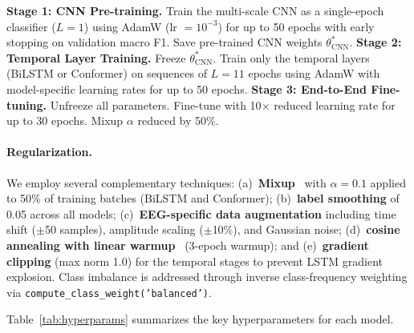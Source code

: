 \documentclass[final]{article}
\begin{document}
\begin{algorithm}[t]
\caption{Three-Stage Training Pipeline}
\label{alg:training}
\begin{algorithmic}[1]
\STATE \textbf{Stage 1: CNN Pre-training.} Train the multi-scale CNN as a single-epoch classifier ($L=1$) using AdamW (lr $= 10^{-3}$) for up to 50 epochs with early stopping on validation macro F1.
\STATE Save pre-trained CNN weights $\theta_{\text{CNN}}^{*}$.
\STATE \textbf{Stage 2: Temporal Layer Training.} Freeze $\theta_{\text{CNN}}^{*}$. Train only the temporal layers (BiLSTM or Conformer) on sequences of $L = 11$ epochs using AdamW with model-specific learning rates for up to 50 epochs.
\STATE \textbf{Stage 3: End-to-End Fine-tuning.} Unfreeze all parameters. Fine-tune with 10$\times$ reduced learning rate for up to 30 epochs. Mixup $\alpha$ reduced by 50\%.
\end{algorithmic}
\end{algorithm}

\paragraph{Regularization.} We employ several complementary techniques: (a)~\textbf{Mixup}~\cite{Zhang2018} with $\alpha = 0.1$ applied to 50\% of training batches (BiLSTM and Conformer); (b)~\textbf{label smoothing} of 0.05 across all models; (c)~\textbf{EEG-specific data augmentation} including time shift ($\pm$50 samples), amplitude scaling ($\pm$10\%), and Gaussian noise; (d)~\textbf{cosine annealing with linear warmup}~\cite{Loshchilov2017} (3-epoch warmup); and (e)~\textbf{gradient clipping} (max norm 1.0) for the temporal stages to prevent LSTM gradient explosion. Class imbalance is addressed through inverse class-frequency weighting via \texttt{compute\_class\_weight('balanced')}.

Table~\ref{tab:hyperparams} summarizes the key hyperparameters for each model.
\end{document}
